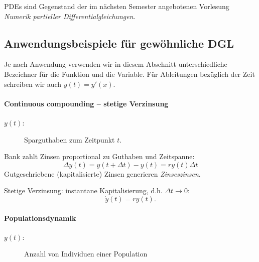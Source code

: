 \documentclass[12pt,a4paper]{book}
\theoremstyle{break}
\theoremstyle{nonumberplain}
\newcommand{\1}{\mathbbm{1}} 			      	%
\begin{document}
PDEs sind Gegenstand der im nächsten Semester angebotenen Vorlesung \emph{Numerik partieller Differentialgleichungen}.

\subsection{Anwendungsbeispiele für gewöhnliche DGL}

Je nach Anwendung verwenden wir in diesem Abschnitt unterschiedliche Bezeichner für die Funktion und
die Variable. Für Ableitungen bezüglich der Zeit schreiben wir auch 
$\dot y(t)=y'(x)$.

\paragraph{Continuous compounding -- stetige Verzinsung} 


\begin{description}
\item[$y(t)$:] Sparguthaben zum Zeitpunkt $t$.
\end{description}

Bank zahlt Zinsen proportional zu Guthaben und Zeitspanne:
\[
\Delta y(t)=y(t+\Delta t)-y(t)= r y(t) \Delta t
\]
Gutgeschriebene (kapitalisierte) Zinsen generieren \emph{Zinseszinsen}.

Stetige Verzinsung: instantane Kapitalisierung, d.h. $\Delta t\to 0$:
\[
\dot y(t)=r y(t).
\]


\paragraph{Populationsdynamik}

\begin{description}
\item[$y(t)$:] Anzahl von Individuen einer Population
\end{description}
\end{document}
